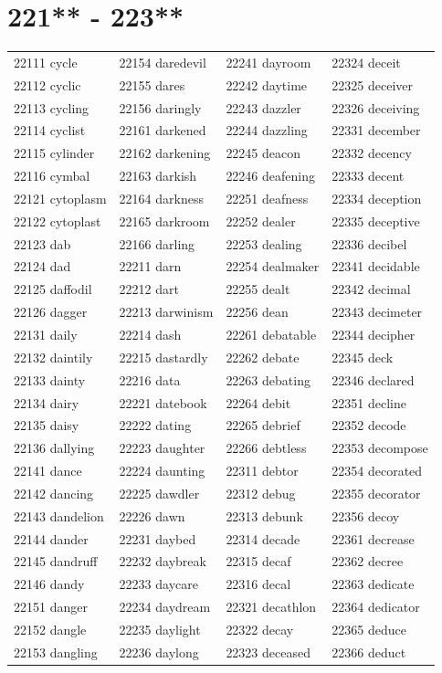 \documentclass[10pt, oneside]{book}
\begin{document}
\begin{table}
	\centering
	\section*{221** - 223**}
	\begin{tabular}{l l l l}
22111 cycle &22154 daredevil &22241 dayroom &22324 deceit\\
22112 cyclic &22155 dares &22242 daytime &22325 deceiver\\
22113 cycling &22156 daringly &22243 dazzler &22326 deceiving\\
22114 cyclist &22161 darkened &22244 dazzling &22331 december\\
22115 cylinder &22162 darkening &22245 deacon &22332 decency\\
22116 cymbal &22163 darkish &22246 deafening &22333 decent\\
22121 cytoplasm &22164 darkness &22251 deafness &22334 deception\\
22122 cytoplast &22165 darkroom &22252 dealer &22335 deceptive\\
22123 dab &22166 darling &22253 dealing &22336 decibel\\
22124 dad &22211 darn &22254 dealmaker &22341 decidable\\
22125 daffodil &22212 dart &22255 dealt &22342 decimal\\
22126 dagger &22213 darwinism &22256 dean &22343 decimeter\\
22131 daily &22214 dash &22261 debatable &22344 decipher\\
22132 daintily &22215 dastardly &22262 debate &22345 deck\\
22133 dainty &22216 data &22263 debating &22346 declared\\
22134 dairy &22221 datebook &22264 debit &22351 decline\\
22135 daisy &22222 dating &22265 debrief &22352 decode\\
22136 dallying &22223 daughter &22266 debtless &22353 decompose\\
22141 dance &22224 daunting &22311 debtor &22354 decorated\\
22142 dancing &22225 dawdler &22312 debug &22355 decorator\\
22143 dandelion &22226 dawn &22313 debunk &22356 decoy\\
22144 dander &22231 daybed &22314 decade &22361 decrease\\
22145 dandruff &22232 daybreak &22315 decaf &22362 decree\\
22146 dandy &22233 daycare &22316 decal &22363 dedicate\\
22151 danger &22234 daydream &22321 decathlon &22364 dedicator\\
22152 dangle &22235 daylight &22322 decay &22365 deduce\\
22153 dangling &22236 daylong &22323 deceased &22366 deduct\\
	\end{tabular}
 \end{table}
\clearpage
\end{document}
